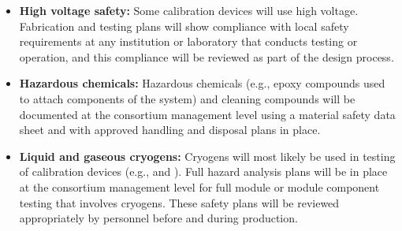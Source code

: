 \begin{itemize}

\item {\bf High voltage safety:} Some calibration devices will use high voltage. Fabrication and testing plans will show compliance with local  safety requirements at any institution or laboratory that conducts testing or operation, and this compliance will be reviewed as part of the design process.

\item {\bf Hazardous chemicals:} Hazardous chemicals (e.g., epoxy compounds used to attach components of the system) and cleaning compounds will be documented at the consortium management level using a material safety data sheet and with approved handling and disposal plans in place.

\item {\bf Liquid and gaseous cryogens:} Cryogens will most likely be used in testing  of calibration devices (e.g.,  and ). Full hazard analysis plans will be in place at the consortium management level for full module or module component testing that involves cryogens. These safety plans will be reviewed appropriately by   personnel before and during production.

\end{itemize}



